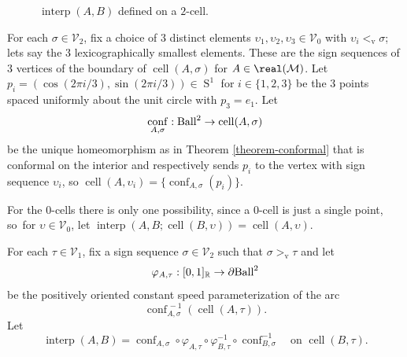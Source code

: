 \documentclass[JEP,XML,SOM,Unicode,NoFloatCountersInSection,published]{cedram}
\theoremstyle{remark}
\let\mc\mathcal
\let\mb\mathbb
\let\phi\varphi
\newcommand{\vv}{{\vvv}}
\DeclareMathOperator{\vvv}{v}
\DeclareMathOperator{\sphere}{S}
\DeclareMathOperator{\cell}{cell}
\DeclareMathOperator{\conf}{conf}
\newcommand{\Ball}{\text{\rm Ball}}
\DeclareMathOperator{\interp}{interp}
\begin{document}
\begin{figure}[htb]
\begin{center}
\end{center}

\caption{$\interp(A,B)$ defined on a $2$-cell.}
\label{figure-interp}

\end{figure}

For each $\sigma \in \mc{V}_{2}$, fix a choice of $3$ distinct elements $\upsilon_1,\upsilon_2,\upsilon_3 \in \mc{V}_{0}$ with $\upsilon_i <_\vv \sigma$; lets say the $3$ lexicographically smallest elements. These are the sign sequences of $3$ vertices of the boundary of $\cell(A,\sigma)$ for $A \in \real(\mc{M})$.
Let $p_i = (\cos (2\pi i/3), \sin (2\pi i/3)) \in \sphere^1$ for $i \in \{1,2,3\}$ be the $3$ points spaced uniformly about the unit circle with $p_3 = e_1$.
Let
\[ \conf_{A,\sigma}: \Ball^2 \to \cell(A,\sigma) \]
be the unique homeomorphism as in Theorem \ref{theorem-conformal} that is conformal on the interior and respectively sends $p_i$ to the vertex with sign sequence $\upsilon_i$, so $\cell(A,\upsilon_i) = \{\conf_{A,\sigma}(p_i)\}$.

For the 0-cells there is only one possibility, since a 0-cell is just a single point, so~for $\upsilon \in \mc{V}_{0}$,
let $\interp(A,B;\cell(B,\upsilon)) = \cell(A,\upsilon)$.

For each $\tau \in \mc{V}_{1}$, fix a sign sequence $\sigma \in \mc{V}_{2}$ such that $\sigma >_\vv \tau$ and let\vspace*{-3pt}
\[\phi_{A,\tau} : [0,1]_\mb{R} \to \partial{}\Ball^2\] be the positively oriented constant speed parameterization of the arc\vspace*{-3pt}
\[
\conf_{A,\sigma}^{\,-1}(\cell(A,\tau)).
\]
Let\vspace*{-5pt}
\[ \interp(A,B) = \conf_{A,\sigma}^{\phantom1} \circ \phi_{A,\tau}^{\phantom1} \circ \phi_{B,\tau}^{-1} \circ \conf_{B,\sigma}^{-1} \quad
\text{on } \cell(B,\tau).\]
\end{document}
